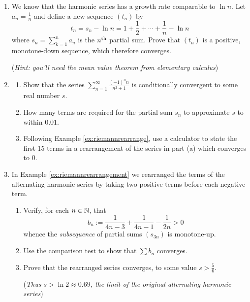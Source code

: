 \begin{exercisessec}{}{}
\begin{enumerate}
  
  \item\label{exs:integralestimates}
		We know that the harmonic series has a growth rate comparable to $\ln n$. Let $a_n=\frac 1n$ and define a new sequence $(t_n)$ by
		\[t_n=s_n-\ln n =1+\frac 12+\cdots +\frac 1n-\ln n\]
		where $s_n=\sum\limits_{k=1}^na_n$ is the $n\textsuperscript{th}$ partial sum. Prove that $(t_n)$ is a positive, monotone-down sequence, which therefore converges.\footnotemark{}\par
		(\emph{Hint: you'll need the mean value theorem from elementary calculus})

	
  \item\begin{enumerate}
    \item Show that the series $\sum\limits_{n=1}^\infty \frac{(-1)^nn}{n^2+1}$ is conditionally convergent to some real number $s$.
    \item How many terms are required for the partial sum $s_n$ to approximate $s$ to within $0.01$.
    \item Following Example \ref{ex:riemannrearrange}, use a calculator to state the first 15 terms in a rearrangement of the series in part (a) which converges to 0. 
  \end{enumerate} 
	
	\item\label{exs:riemannrearrangement} In Example \ref{ex:riemannrearrangement} we rearranged the terms of the alternating harmonic series by taking two positive terms before each negative term.
	\begin{enumerate}
	  \item Verify, for each $n\in\mathbb{N}$, that
		\[
			b_n:=\frac 1{4n-3}+\frac 1{4n-1}-\frac 1{2n}>0
		\]
		whence the \emph{subsequence} of partial sums $(s_{3n})$ is monotone-up.
		\item Use the comparison test to show that $\sum b_n$ converges.
		\item Prove that the rearranged series converges, to some value $s>\frac 56$.\par
		(\emph{Thus $s>\ln 2\approx 0.69$, the limit of the original alternating harmonic series})
	\end{enumerate}
		
\end{enumerate}
\end{exercisessec}

\vspace{-5pt}

